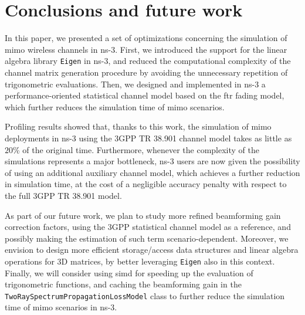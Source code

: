 \section{Conclusions and future work}
\label{sec:conc}

In this paper, we presented a set of optimizations concerning the simulation of \gls{mimo} wireless channels in ns-3. First, we introduced the support for the linear algebra library \texttt{Eigen} in ns-3, and reduced the computational complexity of the channel matrix generation procedure by avoiding the unnecessary repetition of trigonometric evaluations. Then, we designed and implemented in ns-3 a performance-oriented statistical channel model based on the \gls{ftr} fading model, which further reduces the simulation time of \gls{mimo} scenarios. %

Profiling results showed that, thanks to this work, the simulation of \gls{mimo} deployments in ns-3 using the 3GPP TR 38.901 channel model takes as little as $20$\% of the original time. Furthermore, whenever the complexity of the simulations represents a major bottleneck, ns-3 users are now given the possibility of using an additional auxiliary channel model, which achieves a further reduction in simulation time, at the cost of a negligible accuracy penalty with respect to the full 3GPP TR 38.901 model.

As part of our future work, we plan to study more refined beamforming gain correction factors, using the 3GPP statistical channel model as a reference, and possibly making the estimation of such term scenario-dependent. Moreover, we envision to design more efficient storage/access data structures and linear algebra operations for 3D matrices, by better leveraging \texttt{Eigen} also in this context.
Finally, we will consider using \gls{simd} for speeding up the evaluation of trigonometric functions, and caching the beamforming gain in the \texttt{Two\-Ray\-Spectrum\-Propagation\-Loss\-Model} class to further reduce the simulation time of \gls{mimo} scenarios in ns-3.

